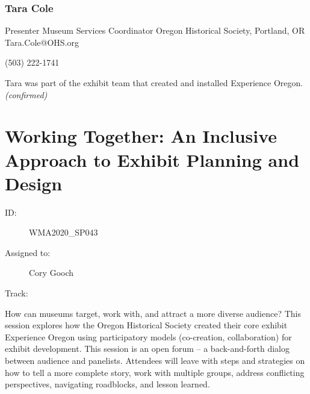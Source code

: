\documentclass{report}
\begin{document}
              
                \subsubsection*{ Tara Cole }
                Presenter\newline
                Museum Services Coordinator\newline
                 Oregon Historical Society, Portland, OR
                \newline
                Tara.Cole@OHS.org\newline
                
                (503) 222-1741\newline

                Tara was part of the exhibit team that created and installed Experience Oregon.
                \emph{ (confirmed) }
              
        
          \newpage
          \section{ Working Together: An Inclusive Approach to Exhibit Planning and Design }
            \begin{description}
              \item [ID:]
              WMA2020\_SP043

              \item [Assigned to:]Cory Gooch~
                \item [Track:]
              \end{description}

              How can museums target, work with, and attract a more diverse audience? This session explores how the Oregon Historical Society created their core exhibit Experience Oregon using participatory models (co-creation, collaboration) for exhibit development. This session is an open forum – a back-and-forth dialog between audience and panelists. Attendees will leave with steps and strategies on how to tell a more complete story, work with multiple groups, address conflicting perspectives, navigating roadblocks, and lesson learned.
\end{document}

